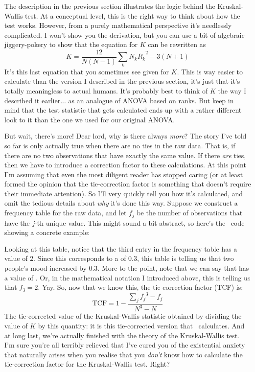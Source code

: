 
The description in the previous section illustrates the logic behind the Kruskal-Wallis test. At a conceptual level, this is the right way to think about how the test works. However, from a purely mathematical perspective it's needlessly complicated. I won't show you the derivation, but you can use a bit of algebraic jiggery-pokery to show that the equation for $K$ can be rewritten as 
$$
K = \frac{12}{N(N-1)} \sum_k N_k {\bar{R}_k}^2    -  3(N+1)
$$
It's this last equation that you sometimes see given for $K$. This is way easier to calculate than the version I described in the previous section, it's just that it's totally meaningless to actual humans. It's probably best to think of $K$ the way I described it earlier... as an analogue of ANOVA based on ranks. But keep in mind that the test statistic that gets calculated ends up with a rather different look to it than the one we used for our original ANOVA.

But wait, there's more! Dear lord, why is there always {\it more}? The story I've told so far is only actually true when there are no ties in the raw data. That is, if there are no two observations that have exactly the same value. If there {\it are} ties, then we have to introduce a correction factor to these calculations. At this point I'm assuming that even the most diligent reader has stopped caring (or at least formed the opinion that the tie-correction factor is something that doesn't require their immediate attention). So I'll very quickly tell you how it's calculated, and omit the tedious details about {\it why} it's done this way. Suppose we construct a frequency table for the raw data, and let $f_j$ be the number of observations that have the $j$-th unique value. This might sound a bit abstract, so here's the \R\ code showing a concrete example:
Looking at this table, notice that the third entry in the frequency table has a value of $2$. Since this corresponds to a  of 0.3, this table is telling us that two people's mood increased by 0.3. More to the point, note that we can say that  has a value of . Or, in the mathematical notation I introduced above, this is telling us that $f_3 = 2$. Yay. So, now that we know this, the tie correction factor (TCF) is:
$$
\mbox{TCF} = 1 - \frac{\sum_j {f_j}^3 - f_j}{N^3 - N} 
$$
The tie-corrected value of the Kruskal-Wallis statistic obtained by dividing the value of $K$ by this quantity: it is this tie-corrected version that \R\ calculates. And at long last, we're actually finished with the theory of the Kruskal-Wallis test. I'm sure you're all terribly relieved that I've cured you of the existential anxiety that naturally arises when you realise that you {\it don't} know how to calculate the tie-correction factor for the Kruskal-Wallis test. Right?


